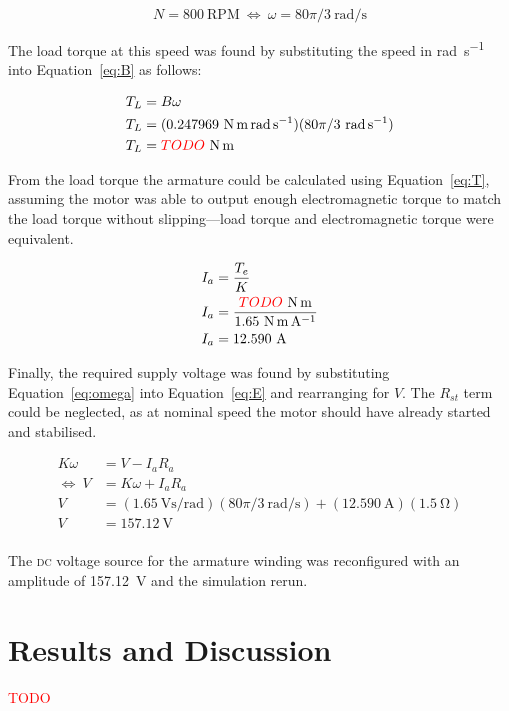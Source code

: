 \documentclass[a4paper,10pt]{article}
\newcommand{\V}{\si{\volt}\xspace}
\newcommand{\A}{\si{\ampere}\xspace}
\newcommand{\Ohm}{\si{\ohm}\xspace}
\newcommand{\Nm}{\si{\newton\metre}\xspace}
\newcommand{\rps}{\si{\radian\per\second}\xspace}
\newcommand{\Vspr}{\si{\volt\second\per\radian}\xspace}
\newcommand{\NmpA}{\si{\newton\metre\per\ampere}\xspace}
\newcommand{\Nmspr}{\si{\newton\metre\radian\per\second}\xspace}
\newcommand{\RPM}{\text{RPM}\xspace}
\newcommand{\DC}{\textsc{dc}\xspace}
\begin{document}
\begin{equation*}
    N = 800~\RPM~\Leftrightarrow~\omega = 80\pi/3~\rps
\end{equation*}

The load torque at this speed was found by substituting the speed in \rps into 
Equation~\vref{eq:B} as follows:

\begin{align*}
    T_L &= B\omega \\
    T_L &= (0.247969~\Nmspr)(80\pi/3~\rps) \\
    T_L &= \textcolor{red}{TODO}~\Nm \\
\end{align*}

From the load torque the armature could be calculated using 
Equation~\ref{eq:T}, assuming the motor was able to output enough 
electromagnetic torque to match the load torque without slipping---load torque 
and electromagnetic torque were equivalent.

\begin{align*}
    I_a &= \frac{T_e}{K} \\
    I_a &= \frac{\textcolor{red}{TODO}~\Nm}{1.65~\NmpA} \\
    I_a &= 12.590~\A \\
\end{align*}

Finally, the required supply voltage was found by substituting 
Equation~\ref{eq:omega} into Equation~\ref{eq:E} and rearranging for $V$. The 
$R_{st}$ term could be neglected, as at nominal speed the motor should have 
already started and stabilised.

\begin{align*}
    K \omega &= V - I_a R_a \\
        \Leftrightarrow~V &= K \omega + I_a R_a \\
    V &= (1.65~\Vspr)(80\pi/3~\rps) + (12.590~\A)(1.5~\Ohm) \\
    V &= 157.12~\V \\
\end{align*}

The \DC voltage source for the armature winding was reconfigured with an 
amplitude of 157.12~\V and the simulation rerun.

\section{Results and Discussion}

\textcolor{red}{TODO}
\end{document}
